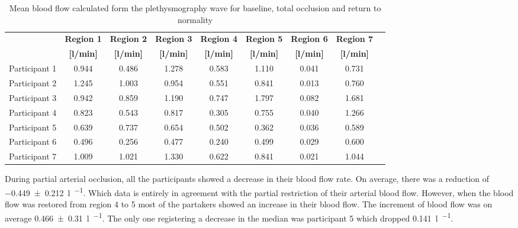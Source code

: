 \begin{table}[!htbp]
	\caption{Mean blood flow calculated form the plethysmography wave for baseline, total occlusion and return to normality}
	\label{tbl:DU_flow}
	\centering \small
	\begin{tabular}{lcccccccc}
		\toprule
		& \textbf{Region 1}
		& \textbf{Region 2}
		& \textbf{Region 3}
		& \textbf{Region 4}
		& \textbf{Region 5}
		& \textbf{Region 6}
		& \textbf{Region 7} \\
		& \textbf{[\si[per-mode=symbol]{\litre\per\minute}]}
		& \textbf{[\si[per-mode=symbol]{\litre\per\minute}]}
		& \textbf{[\si[per-mode=symbol]{\litre\per\minute}]}
		& \textbf{[\si[per-mode=symbol]{\litre\per\minute}]}
		& \textbf{[\si[per-mode=symbol]{\litre\per\minute}]}
		& \textbf{[\si[per-mode=symbol]{\litre\per\minute}]}
		& \textbf{[\si[per-mode=symbol]{\litre\per\minute}]} \\\midrule
		Participant 1    &     0.944     &     0.486     &     1.278     &     0.583     &     1.110     &     0.041     &     0.731     \\  
		Participant 2    &     1.245     &     1.003     &     0.954     &     0.551     &     0.841     &     0.013     &     0.760     \\  
		Participant 3    &     0.942     &     0.859     &     1.190     &     0.747     &     1.797     &     0.082     &     1.681     \\  
		Participant 4    &     0.823     &     0.543     &     0.817     &     0.305     &     0.755     &     0.040     &     1.266     \\  
		Participant 5    &     0.639     &     0.737     &     0.654     &     0.502     &     0.362     &     0.036     &     0.589     \\  
		Participant 6    &     0.496     &     0.256     &     0.477     &     0.240     &     0.499     &     0.029     &     0.600     \\  
		Participant 7    &     1.009     &     1.021     &     1.330     &     0.622     &     0.841     &     0.021     &     1.044     \\  
		\bottomrule
	\end{tabular}
\end{table}

During partial arterial occlusion, all the participants showed a decrease in their blood flow rate. On average, there was a reduction of \SI{-0.449(0212)}{\litre\per\min}. Which data is entirely in agreement with the partial restriction of their arterial blood flow. However, when the blood flow was restored from region 4 to 5 most of the partakers showed an increase in their blood flow. The increment of blood flow was on average \SI{0.466(0310)}{\litre\per\min}. The only one registering a decrease in the median was participant 5 which dropped \SI{0.141}{\litre\per\min}. 

